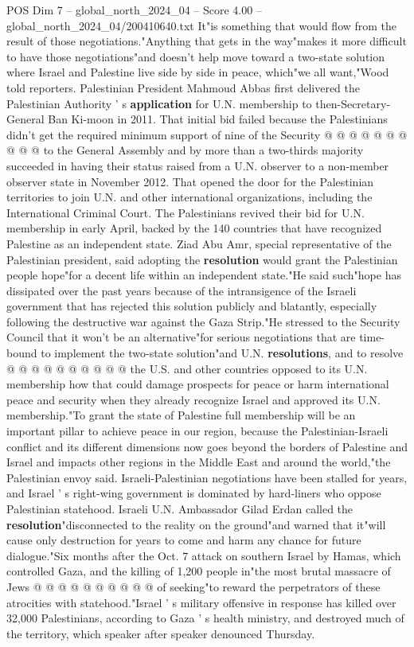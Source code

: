 \begin{textsample}{POS Dim 7 – global\_north\_2024\_04 – Score 4.00 – global\_north\_2024\_04/200410640.txt}
It"is something that would flow from the result of those negotiations."Anything that gets in the way"makes it more difficult to have those negotiations"and doesn't help move toward a two-state solution where Israel and Palestine live side by side in peace, which"we all want,"Wood told reporters.
Palestinian President Mahmoud Abbas first delivered the Palestinian Authority ' s \textbf{application} for U.N. membership to then-Secretary-General Ban Ki-moon in 2011.
That initial bid failed because the Palestinians didn't get the required minimum support of nine of the Security @ @ @ @ @ @ @ @ @ @ to the General Assembly and by more than a two-thirds majority succeeded in having their status raised from a U.N. observer to a non-member observer state in November 2012.
That opened the door for the Palestinian territories to join U.N. and other international organizations, including the International Criminal Court.
The Palestinians revived their bid for U.N. membership in early April, backed by the 140 countries that have recognized Palestine as an independent state.
Ziad Abu Amr, special representative of the Palestinian president, said adopting the \textbf{resolution} would grant the Palestinian people hope"for a decent life within an independent state."He said such"hope has dissipated over the past years because of the intransigence of the Israeli government that has rejected this solution publicly and blatantly, especially following the destructive war against the Gaza Strip."He stressed to the Security Council that it won't be an alternative"for serious negotiations that are time-bound to implement the two-state solution"and U.N. \textbf{resolutions}, and to resolve @ @ @ @ @ @ @ @ @ @ the U.S. and other countries opposed to its U.N. membership how that could damage prospects for peace or harm international peace and security when they already recognize Israel and approved its U.N. membership."To grant the state of Palestine full membership will be an important pillar to achieve peace in our region, because the Palestinian-Israeli conflict and its different dimensions now goes beyond the borders of Palestine and Israel and impacts other regions in the Middle East and around the world,"the Palestinian envoy said.
Israeli-Palestinian negotiations have been stalled for years, and Israel ' s right-wing government is dominated by hard-liners who oppose Palestinian statehood.
Israeli U.N.
Ambassador Gilad Erdan called the \textbf{resolution}"disconnected to the reality on the ground"and warned that it"will cause only destruction for years to come and harm any chance for future dialogue."Six months after the Oct. 7 attack on southern Israel by Hamas, which controlled Gaza, and the killing of 1,200 people in"the most brutal massacre of Jews @ @ @ @ @ @ @ @ @ @ of seeking"to reward the perpetrators of these atrocities with statehood."Israel ' s military offensive in response has killed over 32,000 Palestinians, according to Gaza ' s health ministry, and destroyed much of the territory, which speaker after speaker denounced Thursday.

\end{textsample}
